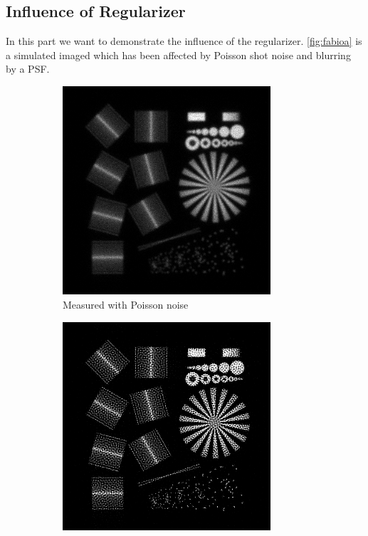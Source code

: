 \documentclass{juliacon}
\begin{document}
    \subsection{Influence of Regularizer}
        In this part we want to demonstrate the influence of the regularizer.
        \autoref{fig:fabioa} is a simulated imaged which has been affected by Poisson shot noise and blurring by a PSF.
        \begin{figure}[h]
            \begin{subfigure}[b]{.25\textwidth}
                \centering
                \includegraphics[width=0.85\textwidth]{figures/resolution_test_chart_blurry.png}
                \caption{Measured with Poisson noise}
                \label{fig:fabioa}
            \end{subfigure}%
            \hfill
            \begin{subfigure}[b]{.25\textwidth}
                \centering
                \includegraphics[width=0.85\textwidth]{figures/resolution_test_chart_no_reg_iter_50.png}

\end{subfigure}
\end{figure}
\end{document}
